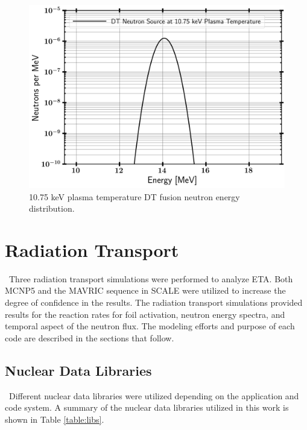 \begin{figure}[htb!]
	\includegraphics[width=13cm]{Figures/Chapter3/Applebe1075keV.png}
	\caption{10.75 keV plasma temperature DT fusion neutron energy distribution.}
	\label{fig:NIFSRC1}
\end{figure}

\section{Radiation Transport}

\ Three radiation transport simulations were performed to analyze ETA. 
Both MCNP5 and the MAVRIC sequence in SCALE were utilized to increase the degree of confidence in the results. 
The radiation transport simulations provided results for the reaction rates for foil activation, neutron energy spectra, and temporal aspect of the neutron flux.
The modeling efforts and purpose of each code are described in the sections that follow. 

\subsection{Nuclear Data Libraries}\label{libraries}

\ Different nuclear data libraries were utilized depending on the application and code system. A summary of the nuclear data libraries utilized in this work is shown in Table \ref{table:libs}. 


